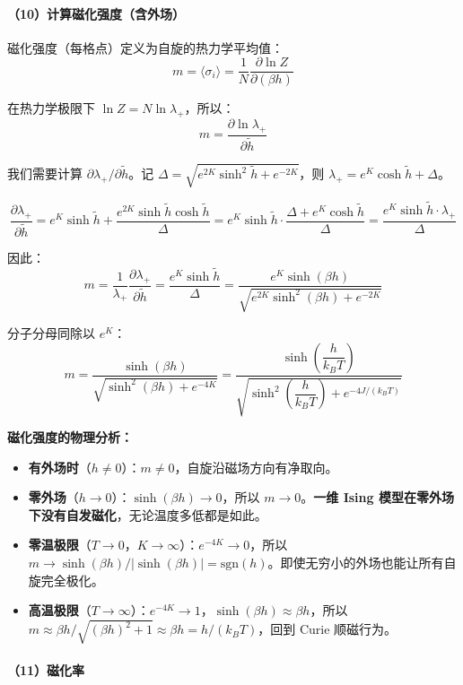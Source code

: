 \documentclass[12pt,a4paper]{ctexart}
\begin{document}
\paragraph{（10）计算磁化强度（含外场）}

磁化强度（每格点）定义为自旋的热力学平均值：
\[
m = \langle \sigma_i \rangle = \frac{1}{N}\frac{\partial \ln Z}{\partial(\beta h)}
\]

在热力学极限下 $\ln Z = N \ln \lambda_+$，所以：
\[
m = \frac{\partial \ln\lambda_+}{\partial \tilde{h}}
\]

我们需要计算 $\partial \lambda_+ / \partial \tilde{h}$。记 $\Delta = \sqrt{e^{2K}\sinh^2\!\tilde{h} + e^{-2K}}$，则 $\lambda_+ = e^K\cosh\tilde{h} + \Delta$。

\[
\frac{\partial \lambda_+}{\partial \tilde{h}} = e^K \sinh\tilde{h} + \frac{e^{2K}\sinh\tilde{h}\cosh\tilde{h}}{\Delta} = e^K\sinh\tilde{h}\cdot\frac{\Delta + e^K\cosh\tilde{h}}{\Delta} = \frac{e^K\sinh\tilde{h}\cdot\lambda_+}{\Delta}
\]

因此：
\[
m = \frac{1}{\lambda_+}\frac{\partial \lambda_+}{\partial \tilde{h}} = \frac{e^K \sinh\tilde{h}}{\Delta} = \frac{e^K \sinh(\beta h)}{\sqrt{e^{2K}\sinh^2(\beta h) + e^{-2K}}}
\]

分子分母同除以 $e^K$：
\begin{equation}
\boxed{
m = \frac{\sinh(\beta h)}{\sqrt{\sinh^2(\beta h) + e^{-4K}}} = \frac{\sinh\!\left(\dfrac{h}{k_BT}\right)}{\sqrt{\sinh^2\!\left(\dfrac{h}{k_BT}\right) + e^{-4J/(k_BT)}}}
}
\end{equation}

\textbf{磁化强度的物理分析：}
\begin{itemize}
    \item \textbf{有外场时}（$h \neq 0$）：$m \neq 0$，自旋沿磁场方向有净取向。
    \item \textbf{零外场}（$h \to 0$）：$\sinh(\beta h) \to 0$，所以 $m \to 0$。\textbf{一维 Ising 模型在零外场下没有自发磁化}，无论温度多低都是如此。
    \item \textbf{零温极限}（$T \to 0$，$K \to \infty$）：$e^{-4K} \to 0$，所以 $m \to \sinh(\beta h)/|\sinh(\beta h)| = \mathrm{sgn}(h)$。即使无穷小的外场也能让所有自旋完全极化。
    \item \textbf{高温极限}（$T \to \infty$）：$e^{-4K} \to 1$，$\sinh(\beta h) \approx \beta h$，所以 $m \approx \beta h / \sqrt{(\beta h)^2 + 1} \approx \beta h = h/(k_BT)$，回到 Curie 顺磁行为。
\end{itemize}

\paragraph{（11）磁化率}
\end{document}
